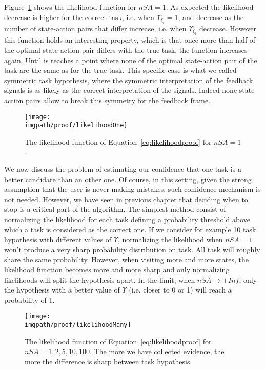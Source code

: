 Figure~\ref{fig:prooflikelihoodone} shows the likelihood function for $nSA = 1$. As expected the likelihood decrease is higher for the correct task, i.e. when $\Upsilon_{\xi_t} = 1$, and decrease as the number of state-action pairs that differ increase, i.e. when $\Upsilon_{\xi_t}$ decrease. However this function holds an interesting property, which is that once more than half of the optimal state-action pair differs with the true task, the function increases again. Until is reaches a point where none of the optimal state-action pair of the task are the same as for the true task. This specific case is what we called symmetric task hypothesis, where the symmetric interpretation of the feedback signals is as likely as  the correct interpretation of the signals. Indeed none state-action pairs allow to break this symmetry for the feedback frame.

\begin{figure}[!ht]
\centering
\texttt{[image: \\imgpath/proof/likelihoodOne]}
\caption{The likelihood function of Equation~\ref{eq:likelihoodproof} for $nSA =1$.}
\label{fig:prooflikelihoodone}
\end{figure}

We now discuss the problem of estimating our confidence that one task is a better candidate than an other one. Of course, in this setting, given the strong assumption that the user is never making mistakes, such confidence mechanism is not needed. However, we have seen in previous chapter that deciding when to stop is a critical part of the algorithm. The simplest method consist of normalizing the likelihood for each task defining a probability threshold above which a task is considered as the correct one. If we consider for example 10 task hypothesis with different values of $\Upsilon$, normalizing the likelihood when $nSA = 1$ won't produce a very sharp probability distribution on task. All task will roughly share the same probability. However, when visiting more and more states, the likelihood function becomes more and more sharp and only normalizing likelihoods will split the hypothesis apart. In the limit, when $nSA \rightarrow +Inf$, only the hypothesis with a better value of $\Upsilon$ (i.e. closer to 0 or 1) will reach a probability of 1.

\begin{figure}[!ht]
\centering
\texttt{[image: \\imgpath/proof/likelihoodMany]}
\caption{The likelihood function of Equation~\ref{eq:likelihoodproof} for $nSA =1,2,5,10,100$. The more we have collected evidence, the more the difference is sharp between task hypothesis.}
\label{fig:prooflikelihoodmany}
\end{figure}


